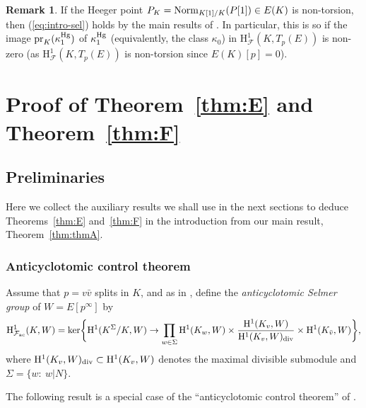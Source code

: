 \documentclass[10pt]{amsart}
\numberwithin{equation}{section}
\theoremstyle{definition}
\newtheorem{remark}[theorem]{Remark}
\theoremstyle{remark}
\newcommand{\Fcal}{\mathcal{F}}
\newcommand{\rH}{\mathrm{H}}
\newcommand{\CF}{\mathcal{F}}
\begin{document}
\begin{remark}\label{rmk:hyp-sel}
If the Heeger point $P_K = {\rm Norm}_{K[1]/K}(P[1])\in E(K)$ is non-torsion, then
{\rm (\ref{eq:intro-sel})} holds by the main results of \cite{kolyvagin-mw-sha}.
In particular, this is so if the image ${\rm pr}_K(\kappa_1^{\rm Hg})$ of $\kappa_1^{\rm Hg}$ 
(equivalently, the class $\kappa_0$) in $\rH^1_{\CF}(K,T_p(E))$ is non-zero 
(as $\rH^1_{\CF}(K,T_p(E))$ is non-torsion since $E(K)[p]= 0$). 
\end{remark}

\section{Proof of Theorem~\ref{thm:E} and Theorem~\ref{thm:F}}
\label{sec:EF}

\subsection{Preliminaries}

Here we collect the auxiliary results we shall use in the next  sections to deduce Theorems~\ref{thm:E} and~\ref{thm:F} in the introduction from our main result, Theorem~\ref{thm:thmA}.

\subsubsection{Anticyclotomic control theorem}

Assume that $p=v\bar{v}$ splits in $K$, and as in \cite[\S{2.2.3}]{jsw}, define the \emph{anticyclotomic Selmer group} of $W=E[p^\infty]$ by
\[
\rH^1_{\Fcal_{\rm ac}}(K,W)={\rm ker}\biggl\{
\rH^1(K^\Sigma/K,W)\rightarrow\prod_{w\in \Sigma}\rH^1(K_w,W)\times\frac{\rH^1(K_v,W)}{\rH^1(K_v,W)_{\rm div}}\times\rH^1(K_{\bar{v}},W)\biggr\},
\]
where $\rH^1(K_v,W)_{\rm div}\subset\rH^1(K_v,W)$ denotes the maximal divisible submodule and $\Sigma=\{w: \ w\vert N\}$. 

The following result is a special case of the ``anticyclotomic control theorem'' of \cite[\S{3}]{jsw}.
\end{document}
